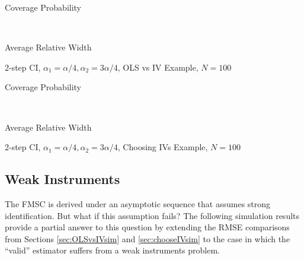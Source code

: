 \begin{table}[h]
  \centering
  \begin{subtable}{0.48\textwidth}
    \caption{Coverage Probability}
    
  \end{subtable}
  ~
  \begin{subtable}{0.48\textwidth}
    \caption{Average Relative Width}
    
  \end{subtable}
  \caption{2-step CI, $\alpha_1 = \alpha/4,\alpha_2 = 3\alpha/4$, OLS vs IV Example, $N=100$}
  \label{tab:CISim100_2stepWideTau_OLSvsIV}
\end{table}

\begin{table}[h]
  \centering
  \begin{subtable}{0.48\textwidth}
    \caption{Coverage Probability}
    
  \end{subtable}
  ~
  \begin{subtable}{0.48\textwidth}
    \caption{Average Relative Width}
    
  \end{subtable}
  \caption{2-step CI, $\alpha_1 = \alpha/4,  \alpha_2 = 3\alpha/4$, Choosing IVs Example, $N=100$}
  \label{tab:CISim100_2stepWideTau_ChooseIVs}
\end{table}

\newpage

\subsection{Weak Instruments} 
\label{sec:appendWeak}
The FMSC is derived under an asymptotic sequence that assumes strong identification.
But what if this assumption fails? 
The following simulation results provide a partial answer to this question by extending the RMSE comparisons from Sections \ref{sec:OLSvsIVsim} and \ref{sec:chooseIVsim} to the case in which the ``valid'' estimator suffers from a weak instruments problem.

